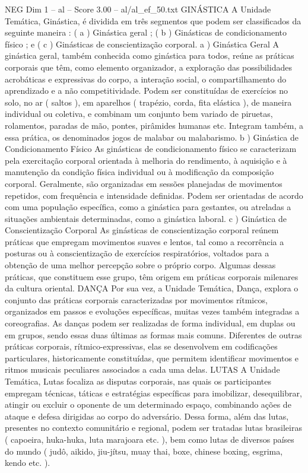 \begin{textsample}{NEG Dim 1 – al – Score 3.00 – al/al\_ef\_50.txt}  \label{ex:f1_neg_131}
GINÁSTICA A Unidade Temática, Ginástica, é dividida em três segmentos que podem ser classificados da seguinte maneira : ( a ) Ginástica geral ; ( b ) Ginásticas de condicionamento físico ; e ( c ) Ginásticas de conscientização corporal. a ) Ginástica Geral A ginástica geral, também conhecida como ginástica para todos, reúne as práticas corporais que têm, como elemento organizador, a exploração das possibilidades acrobáticas e expressivas do corpo, a interação social, o compartilhamento do aprendizado e a não competitividade.
Podem ser constituídas de exercícios no solo, no ar ( saltos ), em aparelhos ( trapézio, corda, fita elástica ), de maneira individual ou coletiva, e combinam um conjunto bem variado de piruetas, rolamentos, paradas de mão, pontes, pirâmides humanas etc.
Integram também, a essa prática, os denominados jogos de malabar ou malabarismo. b ) Ginástica de Condicionamento Físico As ginásticas de condicionamento físico se caracterizam pela exercitação corporal orientada à melhoria do rendimento, à aquisição e à manutenção da condição física individual ou à modificação da composição corporal.
Geralmente, são organizadas em sessões planejadas de movimentos repetidos, com frequência e intensidade definidas.
Podem ser orientadas de acordo com uma população específica, como a ginástica para gestantes, ou atreladas a situações ambientais determinadas, como a ginástica laboral. c ) Ginástica de Conscientização Corporal As ginásticas de conscientização corporal reúnem práticas que empregam movimentos suaves e lentos, tal como a recorrência a posturas ou à conscientização de exercícios respiratórios, voltados para a obtenção de uma melhor percepção sobre o próprio corpo.
Algumas dessas práticas, que constituem esse grupo, têm origem em práticas corporais milenares da cultura oriental.
DANÇA Por sua vez, a Unidade Temática, Dança, explora o conjunto das práticas corporais caracterizadas por movimentos rítmicos, organizados em passos e evoluções específicas, muitas vezes também integradas a coreografias.
As danças podem ser realizadas de forma individual, em duplas ou em grupos, sendo essas duas últimas as formas mais comuns.
Diferentes de outras práticas corporais, rítmico-expressivas, elas se desenvolvem em codificações particulares, historicamente constituídas, que permitem identificar movimentos e ritmos musicais peculiares associados a cada uma delas.
LUTAS A Unidade Temática, Lutas focaliza as disputas corporais, nas quais os participantes empregam técnicas, táticas e estratégias específicas para imobilizar, desequilibrar, atingir ou excluir o oponente de um determinado espaço, combinando ações de ataque e defesa dirigidas ao corpo do adversário.
Dessa forma, além das lutas, presentes no contexto comunitário e regional, podem ser tratadas lutas brasileiras ( capoeira, huka-huka, luta marajoara etc. ), bem como lutas de diversos países do mundo ( judô, aikido, jiu-jítsu, muay thai, boxe, chinese boxing, esgrima, kendo etc. ).

\end{textsample}
